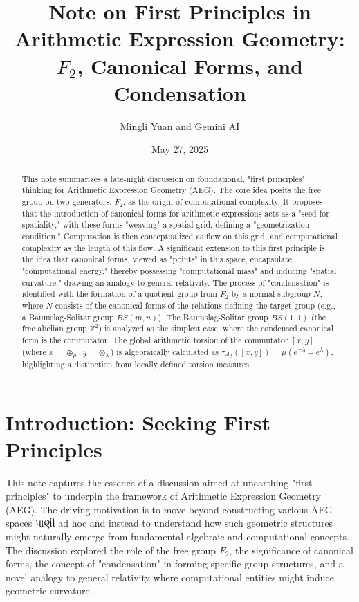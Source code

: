 \documentclass[12pt, a4paper]{article}
\title{Note on First Principles in Arithmetic Expression Geometry: $F_2$, Canonical Forms, and Condensation}
\author{Mingli Yuan and Gemini AI}
\date{May 27, 2025}
\theoremstyle{definition}
\begin{document}
\maketitle
\begin{abstract}
This note summarizes a late-night discussion on foundational, "first principles" thinking for Arithmetic Expression Geometry (AEG). The core idea posits the free group on two generators, $F_2$, as the origin of computational complexity. It proposes that the introduction of canonical forms for arithmetic expressions acts as a "seed for spatiality," with these forms "weaving" a spatial grid, defining a "geometrization condition." Computation is then conceptualized as flow on this grid, and computational complexity as the length of this flow. A significant extension to this first principle is the idea that canonical forms, viewed as "points" in this space, encapsulate "computational energy," thereby possessing "computational mass" and inducing "spatial curvature," drawing an analogy to general relativity. The process of "condensation" is identified with the formation of a quotient group from $F_2$ by a normal subgroup $N$, where $N$ consists of the canonical forms of the relations defining the target group (e.g., a Baumslag-Solitar group $BS(m,n)$). The Baumslag-Solitar group $BS(1,1)$ (the free abelian group $\mathbb{Z}^2$) is analyzed as the simplest case, where the condensed canonical form is the commutator. The global arithmetic torsion of the commutator $[x,y]$ (where $x = \oplus_\mu, y = \otimes_\lambda$) is algebraically calculated as $\tau_{\text{alg}}([x,y]) = \mu(e^{-\lambda} - e^\lambda)$, highlighting a distinction from locally defined torsion measures.
\end{abstract}

\tableofcontents
\newpage

\section{Introduction: Seeking First Principles}

This note captures the essence of a discussion aimed at unearthing "first principles" to underpin the framework of Arithmetic Expression Geometry (AEG). The driving motivation is to move beyond constructing various AEG spaces પાણી ad hoc and instead to understand how such geometric structures might naturally emerge from fundamental algebraic and computational concepts. The discussion explored the role of the free group $F_2$, the significance of canonical forms, the concept of "condensation" in forming specific group structures, and a novel analogy to general relativity where computational entities might induce geometric curvature.
\end{document}
